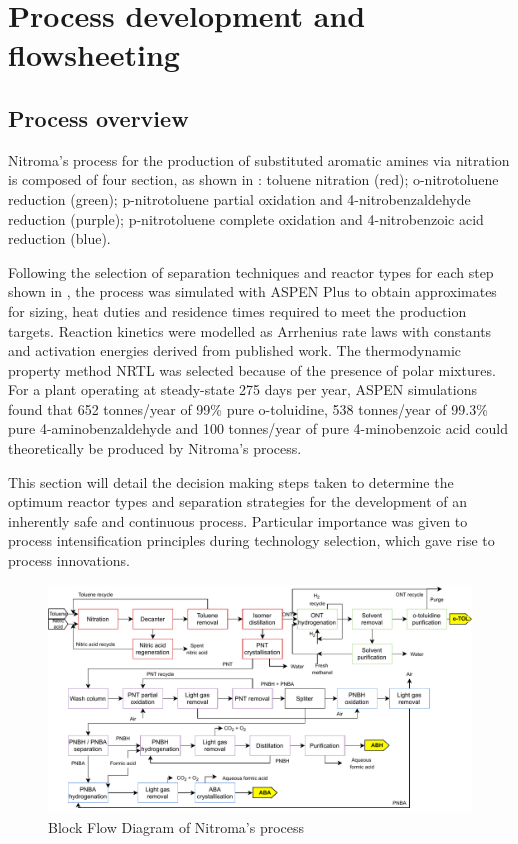 \section{Process development and flowsheeting}

\subsection{Process overview}

Nitroma's process for the production of substituted aromatic amines via nitration is composed of four section, as shown in : toluene nitration (red); o-nitrotoluene reduction (green); p-nitrotoluene partial oxidation and 4-nitrobenzaldehyde reduction (purple); p-nitrotoluene complete oxidation and 4-nitrobenzoic acid reduction (blue). 


Following the selection of separation techniques and reactor types for each step shown in , the process was simulated with ASPEN Plus to obtain approximates for sizing, heat duties and residence times required to meet the production targets. Reaction kinetics were modelled as Arrhenius rate laws with constants and activation energies derived from published work. The thermodynamic property method NRTL was selected because of the presence of polar mixtures. For a plant operating at steady-state 275 days per year, ASPEN simulations found that 652 tonnes/year of 99\% pure o-toluidine, 538 tonnes/year of 99.3\% pure 4-aminobenzaldehyde and 100 tonnes/year of pure 4-minobenzoic acid could theoretically be produced by Nitroma's process.


This section will detail the decision making steps taken to determine the optimum reactor types and separation strategies for the development of an inherently safe and continuous process. Particular importance was given to process intensification principles during technology selection, which gave rise to process innovations.

\begin{figure}[H]
    \centering
    \includegraphics[width=\linewidth]{chapters/1-synthesis/1-Figures/BFD_nitroma-07_03.pdf}
    \caption{Block Flow Diagram of Nitroma's process}
    \label{fig:BFD}
\end{figure}


